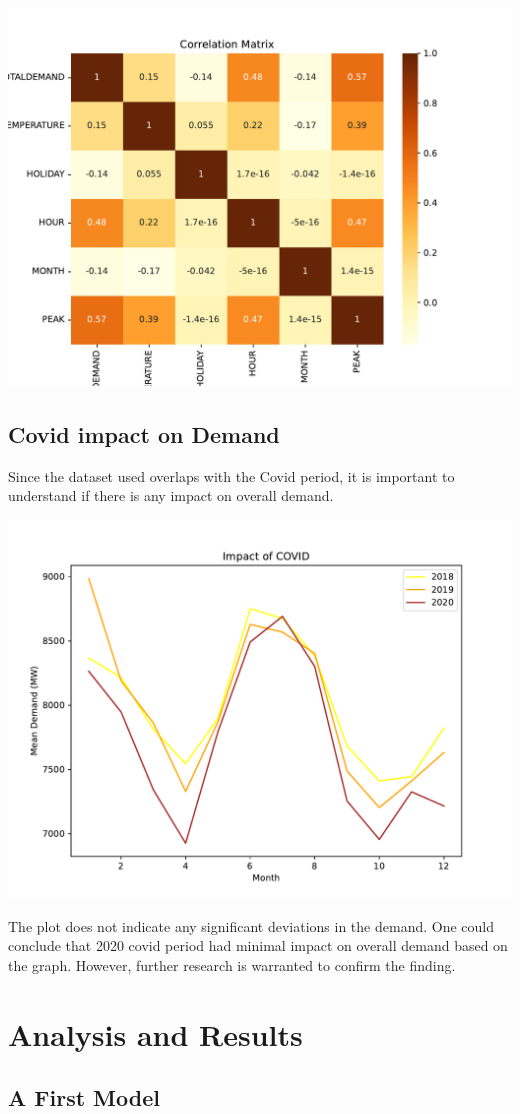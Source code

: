 \documentclass[mstat,12pt]{unswthesis}
\begin{document}
\begin{center}\includegraphics[width=0.5\linewidth]{unsw-ZZSC9020-report-template_files/figure-latex/unnamed-chunk-12-19} \end{center}

\section{Covid impact on Demand}\label{covid-impact-on-demand}

Since the dataset used overlaps with the Covid period, it is important
to understand if there is any impact on overall demand.

\begin{center}\includegraphics[width=0.5\linewidth]{unsw-ZZSC9020-report-template_files/figure-latex/unnamed-chunk-13-21} \end{center}

The plot does not indicate any significant deviations in the demand. One
could conclude that 2020 covid period had minimal impact on overall
demand based on the graph. However, further research is warranted to
confirm the finding.

\chapter{Analysis and Results}\label{analysis-and-results}

\section{A First Model}\label{a-first-model}
\end{document}
